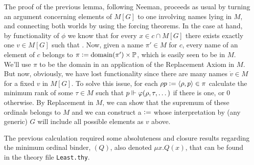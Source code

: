 The proof of the previous lemma, following Neeman, proceeds as usual
by turning an argument concerning elements of $M[G]$ to one involving
names lying in $M$, and connecting both worlds by using the forcing
theorems. In the case at hand, by functionality of $\phi$ we know that
for every $x\in c\cap M[G]$ there exists exactly one $v\in M[G]$ such
that
. Now,
given a name $\pi'\in M$ for $c$, every name of an element of $c$
belongs to $\pi\mathrel{\mathop:}= \operatorname{domain}(\pi')\times \mathbb{P}$, which is easily seen to be
in $M$. We'll use $\pi$ to be the domain in an application of the
Replacement Axiom in $M$. But now, obviously, we have lost
functionality since there are many names $\dot v\in M$ for a fixed $v$
in $M[G]$. To solve this issue, for each $\rho p \mathrel{\mathop:}=\langle\rho,p\rangle\in \pi$ calculate the
minimum rank of some $\tau\in M$ such that 
$p\Vdash \varphi(\rho,\tau,\dots)$ if there is one, or $0$ otherwise. By
Replacement in $M$, we can show that the supremum  of these ordinals
belongs to $M$ and we can construct a  $\mathrel{\mathop:}=$ 
whose interpretation by (any generic) $G$ will include all possible elements
as $v$ above.

The previous calculation required some absoluteness and closure
results regarding the minimum ordinal binder, $(Q)$, also
denoted $\mu x. Q(x)$, that can be found in the theory file
\texttt{Least.thy}.


